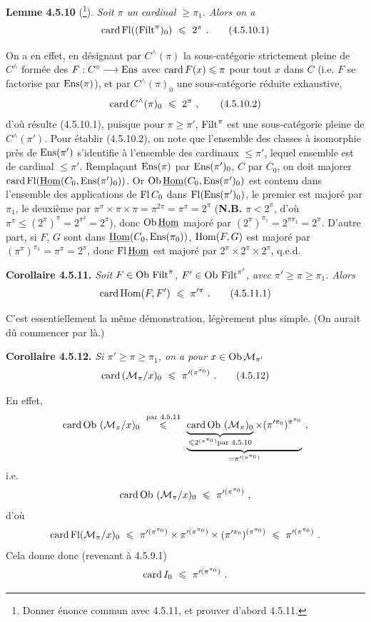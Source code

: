 \textbf{Lemme 4.5.10} (\footnote{Donner énonce commun avec 4.5.11, et prouver d'abord 4.5.11.}). \textit{Soit $\pi$ un cardinal $\geqslant \pi_1$. Alors on a} %
\[
\card \Fl((\Filt^\pi)_0) \ \leqslant \ 2^\pi \ . \tag*{(4.5.10.1)}
\]

On a en effet, en désignant par $C^\wedge(\pi)$ la sous-catégorie strictement pleine de $C^\wedge$ formée des $F : C^\circ \longrightarrow \mathrm{Ens}$ avec $\operatorname{card} F(x) \leqslant \pi$ pour tout $x$ dans $C$ (i.e. $F$ se factorise par $\mathrm{Ens}(\pi)$), et par $C^\wedge(\pi)_0$ une
sous-catégorie réduite exhaustive,
\[
\card C^\wedge(\pi)_0 \ \leqslant \ 2^\pi \ , \tag*{(4.5.10.2)}
\]
d'où résulte (4.5.10.1), puisque pour $\pi \geqslant \pi'$, $\operatorname{Filt}^\pi$ est une sous-catégorie pleine de $C^\wedge(\pi')$. Pour établir (4.5.10.2), on note que l'ensemble des classes à isomorphie près de $\mathrm{Ens}(\pi')$ s'identifie à l'ensemble des cardinaux $\leqslant \pi'$, lequel ensemble est de cardinal $\leqslant \pi'$. Remplaçant $\mathrm{Ens}(\pi)$ par $\mathrm{Ens}(\pi')_0$, $C$ par $C_0$, on doit majorer $\operatorname{card} \operatorname{Fl}(\underline{\mathrm{Hom}}(C_0, \mathrm{Ens}(\pi')_0))$. Or $\mathrm{Ob}\, \underline{\mathrm{Hom}}(C_0, \mathrm{Ens}(\pi')_0)$ est contenu dans l'ensemble des applications de $\operatorname{Fl} C_0$ dans $\operatorname{Fl}(\mathrm{Ens}(\pi')_0)$, le premier est majoré par $\pi_1$, le deuxième par $\pi^\pi \times \pi \times \pi = \pi^{2\pi} = \pi^\pi = 2^\pi$ (\textbf{N.B.} $\pi < 2^\pi$, d'où $\pi^\pi \leqslant (2^\pi)^\pi = 2^{\pi^2} = 2^\pi$), donc $\mathrm{Ob}\, \underline{\mathrm{Hom}}$ majoré par $(2^\pi)^{\pi_1} = 2^{\pi\pi_1} = 2^\pi$. D'autre part, si $F$, $G$ sont dans $\underline{\mathrm{Hom}}(C_0, \mathrm{Ens}(\pi_0))$, $\mathrm{Hom}(F,G)$ est majoré par $(\pi^\pi)^{\pi_1} = \pi^\pi = 2^\pi$, donc $\operatorname{Fl} \underline{\mathrm{Hom}}$ est majoré par $2^\pi \times 2^\pi \times 2^\pi$, q.e.d.

\textbf{Corollaire 4.5.11.} \textit{Soit $F \in \mathrm{Ob}\, \operatorname{Filt}^\pi$, $F' \in \mathrm{Ob}\, \operatorname{Filt}^{\pi'}$, avec $\pi' \geqslant \pi \geqslant \pi_1$. Alors}
\[
\card \Hom(F, F') \ \leqslant \ \pi'^{\pi} \ . \tag*{(4.5.11.1)}
\]


C'est essentiellement la même démonstration, légèrement plus simple. (On aurait dû commencer par là.)

\textbf{Corollaire 4.5.12.} \textit{Si $\pi' \geqslant \pi \geqslant \pi_1$, on a pour $x \in \mathrm{Ob}\, \mathcal{M}_{\pi'}$}
\[
\card\,(\mathcal{M}_\pi/x)_0 \ \leqslant \ \pi'^{(\pi^{\pi_0})} \ . \tag*{(4.5.12)}
\]

En effet,
\[
\card \Ob\,(\mathcal{M}_\pi/x)_0 \ \overset{\text{par 4.5.11}}{\leqslant} \ \underbrace{\underbrace{\card \Ob\,(\mathcal{M}_\pi)_0}_{\leqslant 2^{(\pi^{\pi_0})} \text{par 4.5.10}} \times (\pi'^{\pi_0})^{\pi^{\pi_0}}}_{= \pi'^{(\pi^{\pi_0})}} \ ,
\]
i.e.
\[
\card \Ob\,(\mathcal{M}_\pi/x)_0 \ \leqslant \ \pi'^{(\pi^{\pi_0})} \ ,
\]
d'où
\[
\card \Fl(\mathcal{M}_\pi/x)_0 \ \leqslant \ \pi'^{(\pi^{\pi_0})} \times \pi'^{(\pi^{\pi_0})} \times (\pi'^{\pi_0})^{(\pi^{\pi_0})} \ \leqslant \ \pi'^{(\pi^{\pi_0})} \ .
\]
Cela donne donc (revenant à 4.5.9.1)
\[
\card I_0 \ \leqslant \ \pi'^{(\pi^{\pi_0})} \ .
\]

